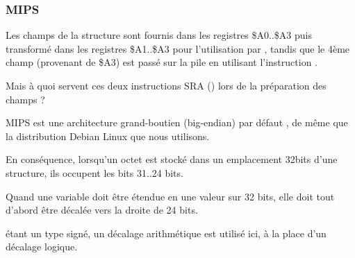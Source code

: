 ﻿\subsubsection{MIPS}
\label{MIPS_structure_big_endian}



Les champs de la structure sont fournis dans les registres \$A0..\$A3 puis transformé dans les registres 
\$A1..\$A3 pour l'utilisation par \printf, tandis que le 4ème champ (provenant de \$A3) est passé sur la 
pile en utilisant l'instruction .

Mais à quoi servent ces deux instructions SRA () lors de la préparation des 
champs \Tchar?

MIPS est une architecture grand-boutien (big-endian) par défaut , de même que la 
distribution Debian Linux que nous utilisons.

En conséquence, lorsqu'un octet est stocké dans un emplacement 32bits d'une structure, ils occupent les 
bits 31..24 bits.

Quand une variable \Tchar doit être étendue en une valeur sur 32 bits, elle doit tout d'abord être décalée 
vers la droite de 24 bits.

\Tchar étant un type signé, un décalage arithmétique est utilisé ici, à la place d'un décalage logique.
